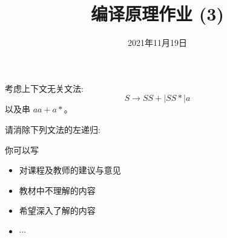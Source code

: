 \documentclass[a4paper, justified]{tufte-handout}
\title{编译原理作业 (3)}
\date{2021年11月19日}
\begin{document}
\maketitle
\noplagiarism %
\begin{abstract}
\end{abstract}
\beginrequired

\begin{problem}[\score{10}]
  考虑上下文无关文法:
  \[
    S \to S S + \mid S S \ast \mid a
  \]
  以及串 $a a + a \ast$。
\end{problem}

\begin{solution}
\end{solution}

\begin{problem}[\score{10}]
  请消除下列文法的左递归:
  
\end{problem}

\begin{solution}
\end{solution}



\beginfb

你可以写
\begin{itemize}
  \item 对课程及教师的建议与意见
  \item 教材中不理解的内容
  \item 希望深入了解的内容
  \item $\cdots$
\end{itemize}
\end{document}

